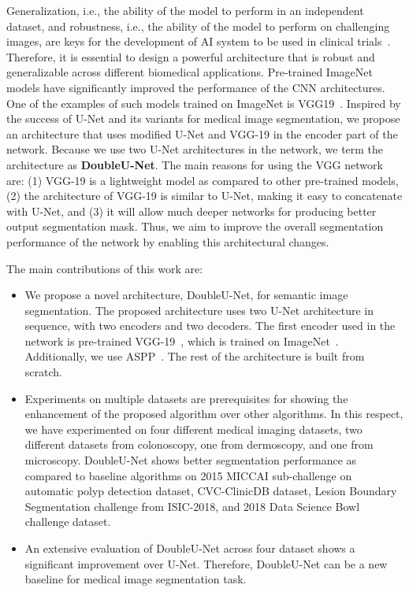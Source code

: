 \documentclass[conference]{IEEEtran}
\begin{document}
Generalization, i.e., the ability of the model to perform in an independent dataset, and robustness, i.e., the ability of the model to perform on challenging images, are keys  for the development of \ac{AI} system to be used in clinical trials~\cite{ross2020robust}. Therefore, it is essential to design a powerful architecture that is robust and generalizable across different biomedical applications. Pre-trained ImageNet~\cite{deng2009imagenet} models have significantly improved the performance of the \ac{CNN} architectures. One of the examples of such models trained on ImageNet is VGG19~\cite{simonyan2014very}. Inspired by the success of U-Net and its variants for medical image segmentation, we propose an architecture that uses modified U-Net and VGG-19 in the encoder part of the network. Because we use two U-Net architectures in the network, we term the architecture as \textbf{DoubleU-Net}. The main reasons for using the VGG network are: (1)  VGG-19 is a lightweight model as compared to other pre-trained models, (2) the architecture of VGG-19 is similar to U-Net, making it easy to concatenate with U-Net, and (3) it will allow much deeper networks for producing better output segmentation mask. Thus, we aim to improve the overall segmentation performance of the network by enabling this architectural changes. 

The main contributions of this work are: 
\begin{itemize}

\item We propose a novel architecture, DoubleU-Net, for semantic image segmentation. The proposed architecture uses two U-Net architecture in sequence, with two encoders and two decoders. The first encoder used in the network is pre-trained VGG-19~\cite{simonyan2014very}, which is trained on ImageNet~\cite{deng2009imagenet}. Additionally, we use \acf{ASPP}~\cite{chen2017rethinking}. The rest of the architecture is built from scratch. 

\item Experiments on multiple datasets are prerequisites for showing the enhancement of the proposed algorithm over other algorithms. In this respect, we have experimented on four different medical imaging datasets, two different datasets from colonoscopy, one from dermoscopy, and one from microscopy. DoubleU-Net shows better segmentation performance as compared to baseline algorithms on 2015 MICCAI sub-challenge on automatic polyp detection dataset, CVC-ClinicDB dataset, Lesion Boundary Segmentation challenge from ISIC-2018, and 2018 Data Science Bowl challenge dataset. 

\item An extensive evaluation of DoubleU-Net across four dataset shows a significant improvement over U-Net. Therefore, DoubleU-Net can be a new baseline for medical image segmentation task. 

\end{itemize}
\end{document}
